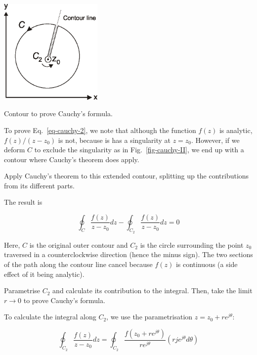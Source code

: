 \begin{marginfigure}
\centering
\includegraphics[width=5cm]{complex/figures/cauchy_II}
\caption{Contour to prove Cauchy's formula.}
\label{fig-cauchy-II}
\end{marginfigure}

To prove Eq.~\ref{eq-cauchy-2}, we note that although the function $f(z)$ is analytic, $f(z)/(z-z_0)$ is not, because is has a singularity at $z=z_0$. However, if we deform ${C}$ to exclude the singularity as in Fig.~\ref{fig-cauchy-II}, we end up with a contour where Cauchy's theorem does apply.

\begin{cue}
Apply Cauchy's theorem to this extended contour, splitting up the contributions from its different parts.
\end{cue}

The result is

\begin{equation}
\oint_{{C}} \frac{f(z)} {z-z_0} dz -\oint_{{C}_2} \frac{f(z)}
{z-z_0} dz=0
\end{equation} 

Here, ${C}$ is the original outer contour and ${C}_2$ is the circle surrounding the point $z_0$ traversed in a counterclockwise direction (hence the minus sign). The two sections of the path along the contour line cancel because $f(z)$ is continuous (a side effect of it being analytic).

\begin{cue}
Parametrise ${C}_2$ and calculate its contribution to the integral. Then, take the limit $ r \to 0 $ to prove Cauchy's formula.   
\end{cue}

To calculate the integral along ${C}_2$, we use the parametrisation $z=z_0 + r e^{j\theta}$:

\begin{equation}
\oint_{{C}_2} \frac{f(z)} {z-z_0} dz = \oint_{{C}_2} \frac{f(z_0
+ r e^{j\theta})} {r e^{j\theta}} \left(rje^{j \theta} d \theta\right)
\end{equation}

